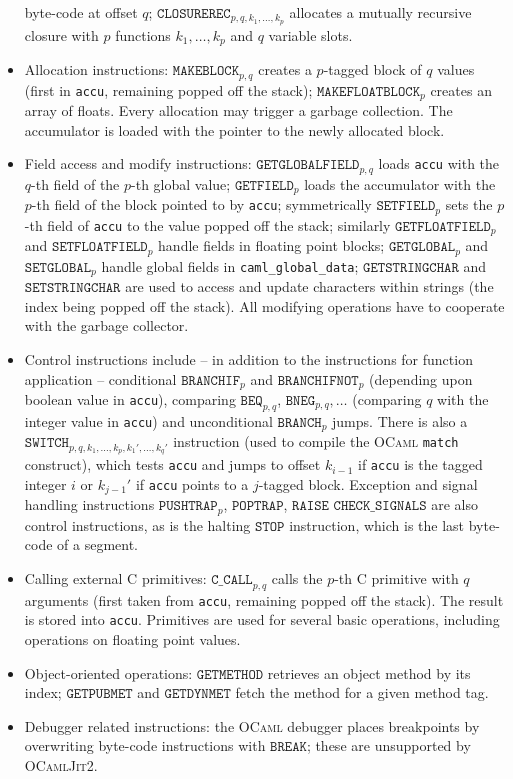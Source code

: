 \documentclass[a4paper]{acm_proc_article-sp}
\begin{document}
\begin{itemize}
  byte-code at offset $q$; $\mathtt{CLOSUREREC}_{p,q,k_1,\ldots,k_p}$ allocates a mutually recursive 
  closure with $p$ functions $k_1,\ldots,k_p$ and $q$ variable slots.
\item Allocation instructions: $\mathtt{MAKEBLOCK}_{p,q}$ creates a $p$-tagged block of $q$ values (first
  in \texttt{accu}, remaining popped off the stack); $\mathtt{MAKEFLOATBLOCK}_p$ creates an array of floats.
  Every allocation may trigger a garbage collection. The accumulator is loaded with the pointer to the
  newly allocated block.
\item Field access and modify instructions: $\mathtt{GETGLOBALFIELD}_{p,q}$ loads \texttt{accu} with the
  $q$-th field of the $p$-th global value; $\mathtt{GETFIELD}_p$ loads the accumulator with the $p$-th
  field of the block pointed to by \texttt{accu}; symmetrically $\mathtt{SETFIELD}_p$ sets the $p$-th
  field of \texttt{accu} to the value popped off the stack; similarly $\mathtt{GETFLOATFIELD}_p$ and
  $\mathtt{SETFLOATFIELD}_p$ handle fields in floating point blocks; $\mathtt{GETGLOBAL}_p$ and
  $\mathtt{SETGLOBAL}_p$ handle global fields in \texttt{caml\_global\_data}; $\mathtt{GETSTRINGCHAR}$
  and $\mathtt{SETSTRINGCHAR}$ are used to access and update characters within strings (the index
  being popped off the stack). All modifying operations have to cooperate with the garbage collector.
\item Control instructions include -- in addition to the instructions for function application --
  conditional \linebreak[4]$\mathtt{BRANCHIF}_p$ and $\mathtt{BRANCHIFNOT}_p$ (depending upon boolean value in
  \texttt{accu}), comparing $\mathtt{BEQ}_{p,q}$, $\mathtt{BNEG}_{p,q}, \ldots$ (comparing $q$ with
  the integer value in \texttt{accu}) and unconditional $\mathtt{BRANCH}_p$ jumps. There is also
  a $\mathtt{SWITCH}_{p,q,k_1,\ldots,k_p,k_1',\ldots,k_q'}$ instruction (used to compile the \textsc{OCaml}
  \texttt{match} construct), which tests \texttt{accu} and jumps to offset $k_{i-1}$ if \texttt{accu}
  is the tagged integer $i$ or $k_{j-1}'$ if \texttt{accu} points to a $j$-tagged block.
  Exception and signal handling instructions $\mathtt{PUSHTRAP}_p$, $\mathtt{POPTRAP}$, $\mathtt{RAISE}$
  $\mathtt{CHECK\_SIGNALS}$ are also control instructions, as is the halting $\mathtt{STOP}$ instruction,
  which is the last byte-code of a segment.
\item Calling external C primitives: $\mathtt{C\_CALL}_{p,q}$ calls the $p$-th C primitive with
  $q$ arguments (first taken from \texttt{accu}, remaining popped off the stack). The result
  is stored into \texttt{accu}. Primitives are used for several basic operations, including
  operations on floating point values.
\item Object-oriented operations: $\mathtt{GETMETHOD}$ retrieves an object method by its index;
  $\mathtt{GETPUBMET}$ and $\mathtt{GETDYNMET}$ fetch the method for a given method tag.
\item Debugger related instructions: the \textsc{OCaml} debugger places breakpoints by
  overwriting byte-code instructions with $\mathtt{BREAK}$; these are unsupported by
  \textsc{OCamlJit2}.
\end{itemize}
\end{document}
